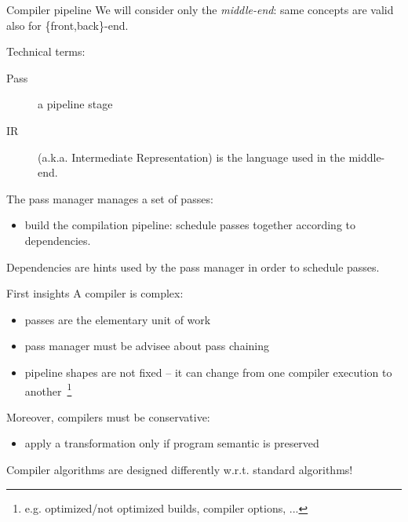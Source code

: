 \documentclass[10pt,mathserif]{beamer}
\begin{document}
\begin{frame}{Compiler pipeline}
	We will consider only the \emph{middle-end}: same concepts are
	valid also for \{front,back\}-end.
	
	\vfill
	Technical terms:
	\begin{description}
		\item[Pass] a pipeline stage
		\item[IR] (a.k.a. Intermediate Representation) is the language used in the
		middle-end.
	\end{description}
	
	\vfill
	The \alert{pass manager} manages a set of passes:
	\begin{itemize}
		\item build the compilation pipeline: \alert{schedule} passes together
		according to \alert{dependencies}.
	\end{itemize}
	
	\vfill
	Dependencies are \alert{hints} used by the pass manager in order to schedule passes.
\end{frame}

\begin{frame}{First insights}
	A compiler is \alert{complex}:
	
	\begin{itemize}
		\item passes are the \alert{elementary unit of work}
		\item pass manager must be advisee about pass \alert{chaining}
		\item pipeline shapes are \alert{not fixed} -- it can change from one compiler
		execution to another~\footnote{e.g. optimized/not optimized builds, compiler options, ...}
	\end{itemize}
	
	\vfill
	Moreover, compilers must be \alert{conservative}:
	
	\begin{itemize}
		\item apply a transformation only if program \alert{semantic is preserved}
	\end{itemize}
	
	\vfill
	Compiler algorithms are designed differently w.r.t. standard algorithms!
\end{frame}

\end{document}

